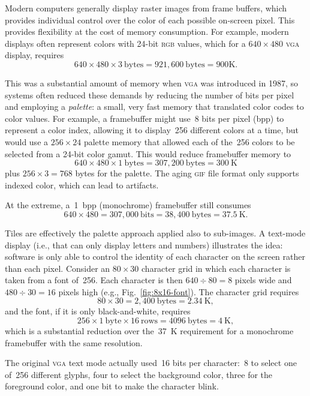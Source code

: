 \documentclass[11pt]{article}
\newcommand{\figref}[1]{Fig.~\ref{fig:#1}}
\begin{document}
Modern computers generally display raster images from frame buffers,
which provides individual control over the color of each possible
on-screen pixel.  This provides flexibility at the cost of memory
consumption.  For example, modern displays often represent colors with
24-bit \textsc{rgb} values, which for a $640\times480$ \textsc{vga}
display, requires
%
\[
640 \times 480 \times 3\ \text{bytes} = 921,600\ \text{bytes} = 900 \text{K}.
\]

This was a substantial amount of memory when \textsc{vga} was
introduced in 1987, so systems often reduced these demands by reducing
the number of bits per pixel and employing a \emph{palette}: a small,
very fast memory that translated color codes to color values.  For
example, a framebuffer might use~8 bits per pixel (bpp) to represent a
color index, allowing it to display~256 different colors at a time,
but would use a $256 \times 24$ palette memory that allowed each of
the~256 colors to be selected from a 24-bit color gamut.  This would
reduce framebuffer memory to
%
\[
640 \times 480 \times 1\ \text{bytes} = 307,200\ \text{bytes} =
300~\text{K}
\]
%
plus $256 \times 3 = 768$ bytes for the palette.  The aging
\textsc{gif} file format only supports indexed color, which can lead
to artifacts.

At the extreme, a~1~bpp (monochrome) framebuffer still consumes
%
\[
640 \times 480 = 307,000~\text{bits} = 38,400~\text{bytes} = 37.5~\text{K}.
\]

Tiles are effectively the palette approach applied also to sub-images.
A text-mode display (i.e., that can only display letters and numbers)
illustrates the idea: software is only able to control the identity of each character on the screen rather than each pixel.  Consider an $80\times
30$ character grid in which each character is taken from a font
of~256.  Each character is then $640 \div 80 = 8$ pixels wide and $480
\div 30 = 16$ pixels high (e.g., \figref{8x16-font}).  The character
grid requires
%
\[
80 \times 30 = 2,400~\text{bytes} = 2.34~\text{K},
\]
%
and the font, if it is only black-and-white, requires
%
\[
256 \times 1~\text{byte} \times 16~\text{rows} = 4096~\text{bytes} = 4~\text{K},
\]
%
which is a substantial reduction over the~37~K requirement for a
monochrome framebuffer with the same resolution.

The original \textsc{vga} text mode actually used~16 bits per
character:~8 to select one of~256 different glyphs, four to select the
background color, three for the foreground color, and one bit to make
the character blink.
\end{document}
